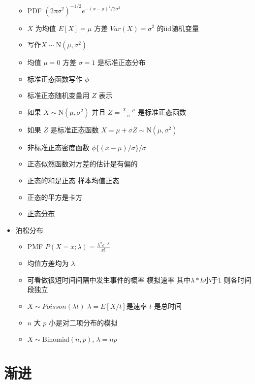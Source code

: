 \documentclass[]{book}
\providecommand{\tightlist}{%
  \setlength{\itemsep}{0pt}\setlength{\parskip}{0pt}}
\begin{document}
\begin{itemize}
  \begin{itemize}
  \tightlist
  \item
    PDF \((2\pi \sigma^2)^{-1/2}e^{-(x - \mu)^2/2\sigma^2}\)
  \item
    \(X\) 为均值 \(E[X] = \mu\) 方差 \(Var(X) = \sigma^2\) 的iid随机变量
  \item
    写作\(X\sim \mbox{N}(\mu, \sigma^2)\)
  \item
    均值 \(\mu = 0\) 方差 \(\sigma = 1\) 是标准正态分布
  \item
    标准正态函数写作 \(\phi\)
  \item
    标准正态随机变量用 \(Z\) 表示
  \item
    如果 \(X \sim \mbox{N}(\mu,\sigma^2)\) 并且 \(Z = \frac{X -\mu}{\sigma}\) 是标准正态函数
  \item
    如果 \(Z\) 是标准正态函数 \(X = \mu + \sigma Z \sim \mbox{N}(\mu, \sigma^2)\)
  \item
    非标准正态密度函数 \(\phi\{(x - \mu) / \sigma\}/\sigma\)
  \item
    正态似然函数对方差的估计是有偏的
  \item
    正态的和是正态 样本均值正态
  \item
    正态的平方是卡方
  \item
    \href{http://songshuhui.net/archives/76501}{正态分布}
  \end{itemize}
\item
  泊松分布

  \begin{itemize}
  \tightlist
  \item
    PMF \(P(X = x; \lambda) = \frac{\lambda^x e^{-\lambda}}{x!}\)
  \item
    均值方差均为 \(\lambda\)
  \item
    可看做很短时间间隔中发生事件的概率 模拟速率 其中\(\lambda * h\)小于1 则各时间段独立
  \item
    \(X \sim Poisson(\lambda t)\) \(\lambda = E[X / t]\)是速率 \(t\) 是总时间
  \item
    \(n\) 大 \(p\) 小是对二项分布的模拟
  \item
    \(X \sim \mbox{Binomial}(n, p)\), \(\lambda = n p\)
  \end{itemize}
\end{itemize}

\hypertarget{ux6e10ux8fdb}{%
\section{渐进}\label{ux6e10ux8fdb}}
\end{document}
